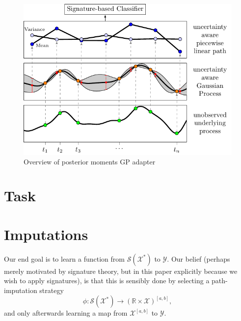 \documentclass{article}
\newcommand{\reals}{\mathbb{R}}
\newcommand{\dataspace}{\mathcal{X}}
\newcommand{\lspace}{\mathcal{Y}}
\newcommand{\seriesspace}{\mathcal{S}}
\begin{document}
\begin{figure}
    \centering
    \includegraphics{figures/overview.pdf}
    \caption{Overview of posterior moments GP adapter}
    \label{fig:overview}
\end{figure}

\section{Task}


\section{Imputations}

Our end goal is to learn a function from $\seriesspace(\dataspace^*)$ to $\lspace$. Our belief (perhaps merely motivated by signature theory, but in this paper explicitly because we wish to apply signatures), is that this is sensibly done by selecting a path-imputation strategy
\begin{equation*}
    \phi \colon \seriesspace(\dataspace^*) \to (\reals \times \dataspace)^{[a, b]},
\end{equation*}
and only afterwards learning a map from $\dataspace^{[a, b]}$ to $\lspace$.
\end{document}

